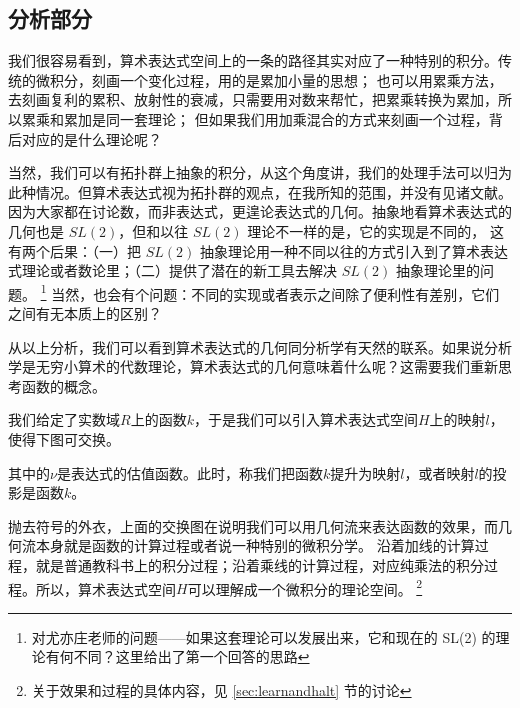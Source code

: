 \documentclass[a4paper,12pt]{article}
\numberwithin{problem}{section}
\numberwithin{definition}{section}
\numberwithin{lemma}{section}
\numberwithin{proposition}{section}
\numberwithin{theorem}{section}
\numberwithin{grammar}{section}
\numberwithin{program}{section}
\numberwithin{convention}{section}
\numberwithin{corollary}{section}
\begin{document}
\subsection{分析部分}

我们很容易看到，算术表达式空间上的一条的路径其实对应了一种特别的积分。传统的微积分，刻画一个变化过程，用的是累加小量的思想；
也可以用累乘方法，去刻画复利的累积、放射性的衰减，只需要用对数来帮忙，把累乘转换为累加，所以累乘和累加是同一套理论；
但如果我们用加乘混合的方式来刻画一个过程，背后对应的是什么理论呢？

当然，我们可以有拓扑群上抽象的积分，从这个角度讲，我们的处理手法可以归为此种情况。但算术表达式视为拓扑群的观点，在我所知的范围，并没有见诸文献。
因为大家都在讨论数，而非表达式，更遑论表达式的几何。抽象地看算术表达式的几何也是 $SL(2)$，但和以往 $SL(2)$ 理论不一样的是，它的实现是不同的，
这有两个后果：（一）把 $SL(2)$ 抽象理论用一种不同以往的方式引入到了算术表达式理论或者数论里；（二）提供了潜在的新工具去解决 $SL(2)$ 抽象理论里的问题。
\footnote{对尤亦庄老师的问题——如果这套理论可以发展出来，它和现在的 SL(2) 的理论有何不同？这里给出了第一个回答的思路}
当然，也会有个问题：不同的实现或者表示之间除了便利性有差别，它们之间有无本质上的区别？

从以上分析，我们可以看到算术表达式的几何同分析学有天然的联系。如果说分析学是无穷小算术的代数理论，算术表达式的几何意味着什么呢？这需要我们重新思考函数的概念。

我们给定了实数域$R$上的函数$k$，于是我们可以引入算术表达式空间$H$上的映射$l$，使得下图可交换。

\begin{center}
\end{center}

其中的$\nu$是表达式的估值函数。此时，称我们把函数$k$提升为映射$l$，或者映射$l$的投影是函数$k$。

抛去符号的外衣，上面的交换图在说明我们可以用几何流来表达函数的效果，而几何流本身就是函数的计算过程或者说一种特别的微积分学。
沿着加线的计算过程，就是普通教科书上的积分过程；沿着乘线的计算过程，对应纯乘法的积分过程。所以，算术表达式空间$H$可以理解成一个微积分的理论空间。
\footnote{关于效果和过程的具体内容，见 \ref{sec:learnandhalt} 节的讨论}
\end{document}
